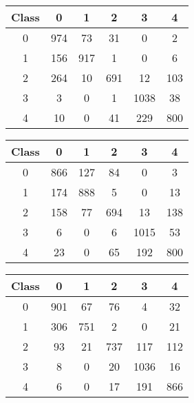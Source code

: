 \documentclass[10pt]{article}
\begin{document}
\begin{minipage}[b]{.30\textwidth}
  \centering
  \begin{tabular}{| c || c | c | c | c | c |}
    \hline
    Class & 0 & 1 & 2 & 3 & 4 \\ \hline \hline
    0 & 974 & 73 & 31 & 0 & 2  \\ \hline
    1 & 156 & 917 & 1 & 0 & 6 \\ \hline
    2 & 264 & 10 & 691 & 12 & 103 \\ \hline
    3 & 3 & 0 & 1 & 1038 & 38\\ \hline
    4 & 10 & 0 & 41 & 229 & 800 \\
    \hline
    \end{tabular}
    \label{confusion_mat_multi}
\end{minipage}\qquad
\begin{minipage}[b]{.30\textwidth}
  \centering
  \begin{tabular}{| c || c | c | c | c | c |}
    \hline
    Class & 0 & 1 & 2 & 3 & 4 \\ \hline \hline
    0 & 866 & 127 & 84 & 0 & 3  \\ \hline
    1 & 174 & 888 & 5 & 0 & 13 \\ \hline
    2 & 158 & 77 & 694 & 13 & 138 \\ \hline
    3 & 6 & 0 & 6 & 1015 & 53\\ \hline
    4 & 23 & 0 & 65 & 192 & 800 \\
    \hline
    \end{tabular}
    \label{confusion_mat_logistic}
\end{minipage}\qquad
\begin{minipage}[b]{.30\textwidth}
  \centering
\begin{tabular}{| c || c | c | c | c | c |}
    \hline
    Class & 0 & 1 & 2 & 3 & 4 \\ \hline \hline
    0 & 901 & 67 & 76 & 4 & 32  \\ \hline
    1 & 306 & 751 & 2 & 0 & 21 \\ \hline
    2 & 93 & 21 & 737 & 117 & 112 \\ \hline
    3 & 8 & 0 & 20 & 1036 & 16\\ \hline
    4 & 6 & 0 & 17 & 191 & 866 \\
    \hline
    \end{tabular}
    \label{confusion_mat_linear}
\end{minipage}
\end{document}

